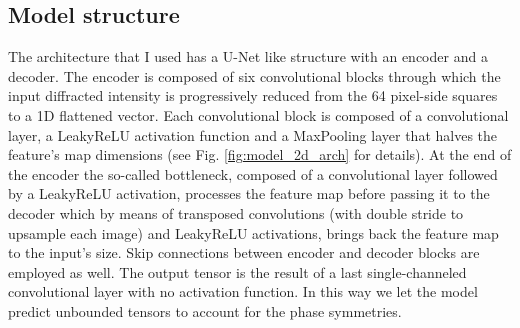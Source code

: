 \subsection{Model structure}
The architecture that I used has a U-Net like structure with an encoder and a decoder. 
The encoder is composed of six convolutional blocks through which the input diffracted intensity is progressively 
reduced from the 64 pixel-side squares to a 1D flattened vector. Each convolutional block is composed of a convolutional 
layer, a LeakyReLU activation function and a MaxPooling layer that halves the feature's map dimensions (see Fig.
\ref{fig:model_2d_arch} for details).
At the end of the encoder the so-called bottleneck, composed of a convolutional layer followed by a LeakyReLU activation, 
processes the feature map before passing it to the decoder which by means of transposed convolutions (with double stride to
upsample each image) and LeakyReLU activations, 
brings back the feature map to the input's size. Skip connections between encoder and decoder blocks 
are employed as well. The output tensor is the result of a last single-channeled convolutional layer with no activation function. 
In this way we let the model predict unbounded tensors to account for the phase symmetries. 

